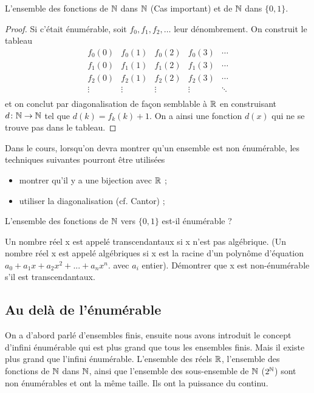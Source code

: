 \begin{myexem}
  \label{exem:fNN}
 L'ensemble des fonctions de $\mathbb{N}$ dans $\mathbb{N}$ (Cas important) et de $\mathbb{N}$ dans $\{0, 1\}$.
 \begin{proof}
   Si c'était énumérable, soit $f_0, f_1, f_2, \ldots$ leur dénombrement.
   On construit le tableau
   \[
     \begin{array}{ccccc}
       f_0(0) & f_0(1) & f_0(2) & f_0(3) & \cdots\\
       f_1(0) & f_1(1) & f_1(2) & f_1(3) & \cdots\\
       f_2(0) & f_2(1) & f_2(2) & f_2(3) & \cdots\\
       \vdots & \vdots & \vdots & \vdots & \ddots\\
     \end{array}
   \]
   et on conclut par diagonalisation de façon semblable à $\mathbb{R}$
   en construisant $d\colon \mathbb{N} \to \mathbb{N}$ tel que $d(k) = f_k(k)+1$.
   On a ainsi une fonction $d(x)$ qui ne se trouve pas dans le tableau.
 \end{proof}
\end{myexem}

Dans le cours, lorsqu'on devra montrer qu'un ensemble est non énumérable,
les techniques suivantes pourront être utilisées
\begin{itemize}
	\item montrer qu'il y a une bijection avec $\mathbb{R}$ ;
	\item utiliser la diagonalisation (cf. Cantor) ;
\end{itemize}

\begin{myexercice}\label{exerc:conceptfct}
L'ensemble des fonctions de $\mathbb{N}$ vers $\{0,1\}$ est-il énumérable ?
\end{myexercice}


\begin{myexercice} \label{exerc:ensembleNonEnumNumTranscendantaux}
Un nombre réel x est appelé transcendantaux si x n'est pas algébrique. (Un nombre réel x est appelé algébriques si x est la racine d'un polynôme d'équation $a_0 + a_1x + a_2x^2 + ... + a_nx^n$.  avec $a_i$ entier).
Démontrer que x est non-énumérable s'il est transcendantaux.
\end{myexercice}

\subsection{Au delà de l'énumérable}
\label{subsec:au_dela_de_l_enumerable}
On a d'abord parlé d'ensembles finis, ensuite nous avons introduit le concept d'infini
énumérable qui est plus grand que tous les ensembles finis. Mais il existe plus grand
que l'infini énumérable. L'ensemble des réels $\mathbb{R}$, l'ensemble des fonctions de $\mathbb{N}$ dans $\mathbb{N}$, ainsi que
l'ensemble des sous-ensemble de $\mathbb{N}$ ($2^{\mathbb{N}}$) sont non énumérables et ont la même taille. Ils ont la puissance du continu.

